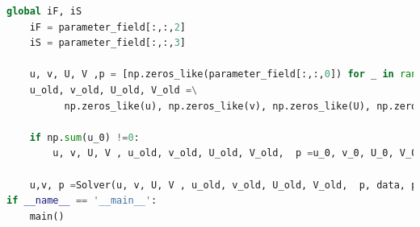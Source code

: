 \documentclass[12pt]{article}
\begin{document}
\begin{scriptsize}
\begin{lstlisting}[language=python,caption={N-S Cylinder Solver}]
    global iF, iS
    iF = parameter_field[:,:,2]
    iS = parameter_field[:,:,3]
    
    u, v, U, V ,p = [np.zeros_like(parameter_field[:,:,0]) for _ in range(5)]
    u_old, v_old, U_old, V_old =\
          np.zeros_like(u), np.zeros_like(v), np.zeros_like(U), np.zeros_like(V)
    
    if np.sum(u_0) !=0:
        u, v, U, V , u_old, v_old, U_old, V_old,  p =u_0, v_0, U_0, V_0 , u_old_0, v_old_0, U_old_0, V_old_0,  p_0

    u,v, p =Solver(u, v, U, V , u_old, v_old, U_old, V_old,  p, data, parameter_field)
if __name__ == '__main__':
    main()
        




\end{lstlisting}





















\end{scriptsize}




\end{document}
